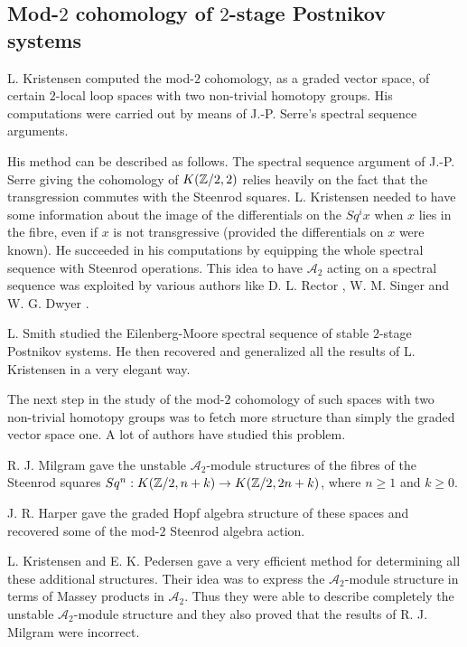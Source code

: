 \subsection*{Mod-$2$ cohomology of $2$-stage Postnikov systems}

L. Kristensen \cite{Kr62} \cite{Kr63} computed the mod-$2$ cohomology, as a graded vector space, of certain $2$-local loop spaces with two non-trivial homotopy groups. His computations were carried out by means of J.-P. Serre's spectral sequence arguments. 

His method can be described as follows. The spectral sequence argument of J.-P. Serre giving the cohomology of $K(\mathbb{Z}/2,2)$ relies heavily on the fact that the transgression commutes with the Steenrod squares. L. Kristensen needed to have some information about the image of the differentials on the $Sq^i x$ when $x$ lies in the fibre, even if $x$ is not transgressive (provided the differentials on $x$ were known). He succeeded in his computations by equipping the whole spectral sequence with Steenrod operations. This idea to have ${\mathcal A}_2$ acting on a spectral sequence was exploited by various authors like D. L. Rector \cite{Re70}, W. M. Singer \cite{Si73-I} \cite{Si73-II} and W. G. Dwyer \cite{Dw80}.

L. Smith \cite{Sm67} studied the Eilenberg-Moore spectral sequence of stable $2$-stage Postnikov systems. He then recovered and generalized all the results of L. Kristensen in a very elegant way.

The next step in the study of the mod-$2$ cohomology of such spaces with two non-trivial homotopy groups was to fetch more structure than simply the graded vector space one. A lot of authors have studied this problem. 

R. J. Milgram \cite{Milg69} gave the unstable ${\mathcal A}_2$-module structures of the fibres of the Steenrod squares $Sq^n:K(\mathbb{Z}/2,n+k)\to K(\mathbb{Z}/2,2n+k)$, where $n\geq1$ and $k\geq0$. 

J. R. Harper \cite{Ha70} gave the graded Hopf algebra structure of these spaces and recovered some of the mod-$2$ Steenrod algebra action. 

L. Kristensen and E. K. Pedersen \cite{KP72} gave a very efficient method for determining all these additional structures. Their idea was to express the ${\mathcal A}_2$-module structure in terms of Massey products in ${\mathcal A}_2$. Thus they were able to describe completely the unstable ${\mathcal A}_2$-module structure and they also proved that the results of R. J. Milgram were incorrect.

